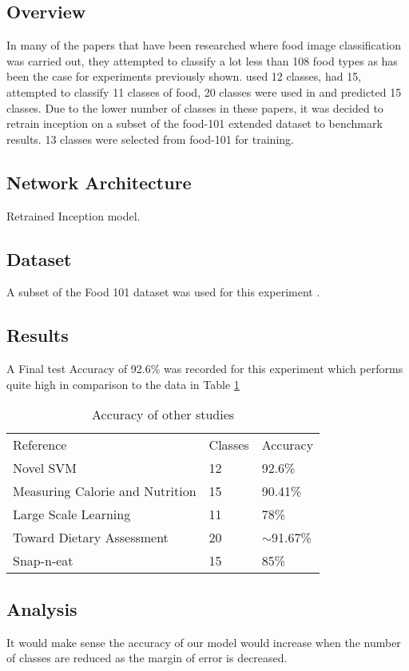 \subsection*{Overview}
In many of the papers that have been researched where food image classification was carried out, they attempted to classify a lot less than 108 food types as has been the case for experiments previously shown.
\textcite{novelSVM} used 12 classes, \textcite{pouladzadeh2014measuring} had 15, \textcite{LSL_2015} attempted to classify 11 classes of food, 20 classes were used in \textcite{chen2010toward} and \textcite{snap} predicted 15 classes.
Due to the lower number of classes in these papers, it was decided to retrain inception on a subset of the food-101 extended dataset to benchmark results.
13 classes were selected from food-101 for training.

\subsection*{Network Architecture}
Retrained Inception model.

\subsection*{Dataset}
A subset of the Food 101 dataset was used for this experiment \textcite{food101}.

\subsection*{Results}
A Final test Accuracy of 92.6\% was recorded for this experiment which performs quite high in comparison to the data in Table \ref{classes_accuracy}

\begin{table}[]
\centering
\caption{Accuracy of other studies}
\label{classes_accuracy}
\begin{tabular}{lll}
Reference                       & Classes & Accuracy      \\
Novel SVM                       & 12      & 92.6\%        \\
Measuring Calorie and Nutrition & 15      & 90.41\%       \\
Large Scale Learning            & 11      & 78\%          \\
Toward Dietary Assessment       & 20      & $\sim$91.67\% \\
Snap-n-eat                      & 15      & 85\%         
\end{tabular}
\end{table}

\subsection*{Analysis}
It would make sense the accuracy of our model would increase when the number of classes are reduced as the margin of error is decreased.